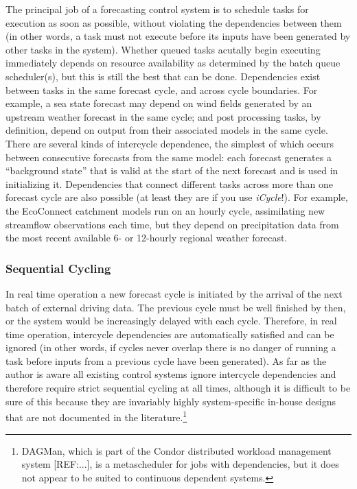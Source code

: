 \documentclass[11pt,a4paper]{article}
\begin{document}
The principal job of a forecasting control system is to schedule tasks
for execution as soon as possible, without violating the dependencies
between them (in other words, a task must not execute before its inputs
have been generated by other tasks in the system).  Whether queued tasks
acutally begin executing immediately depends on resource availability as
determined by the batch queue scheduler(s), but this is still the best
that can be done.  Dependencies exist between tasks in the same forecast
cycle, and across cycle boundaries.  For example, a sea state forecast
may depend on wind fields generated by an upstream weather forecast in
the same cycle; and post processing tasks, by definition, depend on
output from their associated models in the same cycle.  There are
several kinds of intercycle dependence, the simplest of which occurs
between consecutive forecasts from the same model: each forecast
generates a ``background state'' that is valid at the start of the next
forecast and is used in initializing it. Dependencies that connect
different tasks across more than one forecast cycle are also possible
(at least they are if you use {\em iCycle}!).  For example, the
EcoConnect catchment models run on an hourly cycle, assimilating new
streamflow observations each time, but they depend on precipitation data
from the most recent available 6- or 12-hourly regional weather
forecast.

\subsubsection{Sequential Cycling}

In real time operation a new forecast cycle is initiated by the arrival
of the next batch of external driving data. The previous cycle must be
well finished by then, or the system would be increasingly delayed
with each cycle.  Therefore, in real time operation, intercycle
dependencies are automatically satisfied and can be ignored (in other
words, if cycles never overlap there is no danger of running a task
before inputs from a previous cycle have been generated). As far as the
author is aware all existing control systems ignore intercycle
dependencies and therefore require strict sequential cycling at all
times, although it is difficult to be sure of this because they
are invariably highly system-specific in-house designs that are not
documented in the literature.\footnote{DAGMan, which is part of the
Condor distributed workload management system [REF:...], is a
metascheduler for jobs with dependencies, but it does not appear to be
suited to continuous dependent systems.} 
\end{document}
